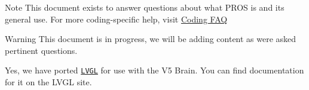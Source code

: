 \begin{DoxyNote}{Note}
This document exists to answer questions about what P\+R\+OS is and its general use. For more coding-\/specific help, visit \hyperlink{md_docs_tutorials_general_coding-faq}{Coding F\+AQ}
\end{DoxyNote}
\begin{DoxyWarning}{Warning}
This document is in progress, we will be adding content as we\textquotesingle{}re asked pertinent questions.
\end{DoxyWarning}


Yes, we have ported \href{https://littlevgl.com/}{\tt L\+V\+GL} for use with the V5 Brain. You can find documentation for it on the L\+V\+GL site. 